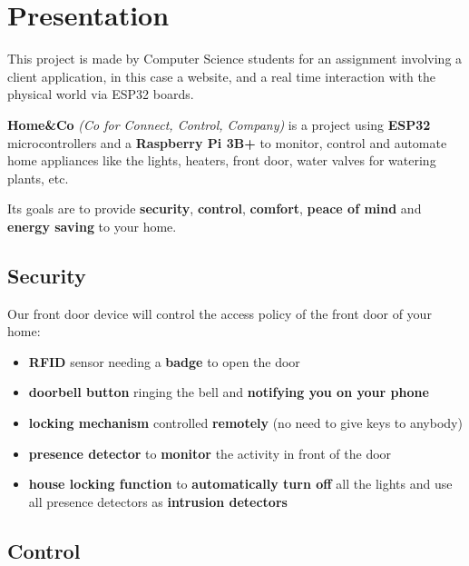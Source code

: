 \documentclass{report}
\begin{document}

\coverpage


\chapter{Presentation}\label{ch:presentation}

This project is made by Computer Science students for an assignment involving a client application, in this case a website, and a real time interaction with the physical world via ESP32 boards.

\textbf{Home\&Co} \emph{(Co for Connect, Control, Company)} is a project using \textbf{ESP32} microcontrollers and a \textbf{Raspberry Pi 3B+} to monitor, control and automate home appliances like the lights, heaters, front door, water valves for watering plants, etc.

Its goals are to provide \textbf{security}, \textbf{control}, \textbf{comfort}, \textbf{peace of mind} and \textbf{energy saving} to your home.

\section{Security}\label{sec:security}

Our front door device will control the access policy of the front door of your home:
\begin{itemize}
    \item \textbf{RFID} sensor needing a \textbf{badge} to open the door
    \item \textbf{doorbell button} ringing the bell and \textbf{notifying you on your phone}
    \item \textbf{locking mechanism} controlled \textbf{remotely} (no need to give keys to anybody)
    \item \textbf{presence detector} to \textbf{monitor} the activity in front of the door
    \item \textbf{house locking function} to \textbf{automatically turn off} all the lights and use all presence detectors as \textbf{intrusion detectors}
\end{itemize}

\section{Control}\label{sec:control}
\end{document}
